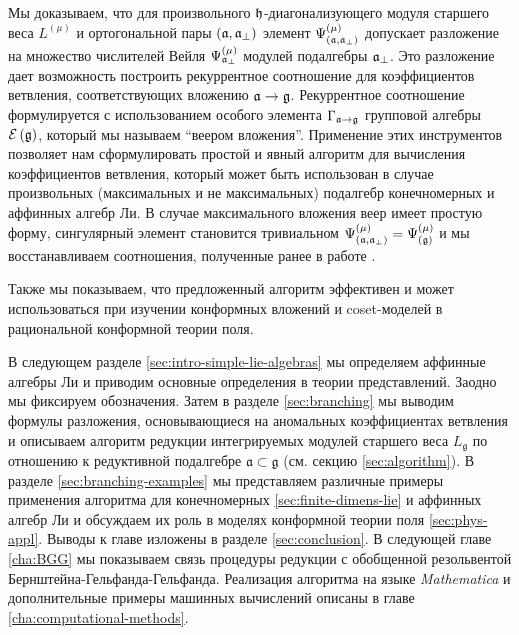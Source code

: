 Мы доказываем, что для произвольного $\mathfrak{h}$-диагонализующего модуля старшего веса $L^{\left( \mu \right)}$ и ортогональной пары $\left(  \mathfrak{a}, \mathfrak{a}_{\perp} \right)$ элемент
$\Psi ^{\left( \mu \right) }_{\left(  \mathfrak{a}, \mathfrak{a}_{\perp} \right)}$ допускает разложение на множество числителей Вейля $\Psi ^{\left( \mu \right) }_{ \mathfrak{a}_{\perp} }$ модулей подалгебры $\mathfrak{a}_{\perp}$.
Это разложение дает возможность построить рекуррентное соотношение для коэффициентов ветвления, соответствующих вложению $\mathfrak{a} \rightarrow \mathfrak{g} $. Рекуррентное соотношение формулируется с использованием особого элемента  $\Gamma_{\mathfrak{a} \rightarrow \mathfrak{g}}$ групповой алгебры
$\mathcal{E}\left( \mathfrak{g} \right)$, который мы называем ``веером вложения''. 
Применение этих инструментов позволяет нам сформулировать простой и явный алгоритм для вычисления коэффициентов ветвления, который может быть использован в случае произвольных (максимальных и не максимальных) подалгебр конечномерных и аффинных алгебр Ли. 
В случае максимального вложения веер имеет простую форму, сингулярный элемент становится тривиальном $\Psi ^{\left( \mu \right) }_{\left(  \mathfrak{a}, \mathfrak{a}_{\perp} \right)}=\Psi ^{\left( \mu \right) }_{\left(  \mathfrak{g}\right)}$ и мы восстанавливаем соотношения, полученные ранее в работе \cite{ilyin812pbc}.

Также мы показываем, что предложенный алгоритм эффективен и может использоваться при изучении конформных вложений и coset-моделей в рациональной конформной теории поля.

В следующем разделе \ref{sec:intro-simple-lie-algebras} мы определяем аффинные алгебры Ли и приводим основные определения в теории представлений.  Заодно мы фиксируем обозначения. Затем в разделе \ref{sec:branching} мы выводим формулы разложения, основывающиеся на аномальных коэффициентах ветвления и описываем алгоритм редукции интегрируемых модулей старшего веса $L_{\mathfrak{g}}$ по отношению к редуктивной подалгебре  $\mathfrak{a}\subset \mathfrak{g}$ (см. секцию \ref{sec:algorithm}). В разделе \ref{sec:branching-examples} мы представляем различные примеры применения алгоритма для конечномерных \ref{sec:finite-dimens-lie} и аффинных алгебр Ли и обсуждаем их роль в моделях конформной теории поля \ref{sec:phys-appl}. Выводы к главе изложены в разделе \ref{sec:conclusion}. В следующей главе \ref{cha:BGG} мы показываем связь процедуры редукции с обобщенной резольвентой Бернштейна-Гельфанда-Гельфанда.  Реализация алгоритма на языке {\it Mathematica} и дополнительные примеры машинных вычислений описаны в главе  \ref{cha:computational-methods}. 

